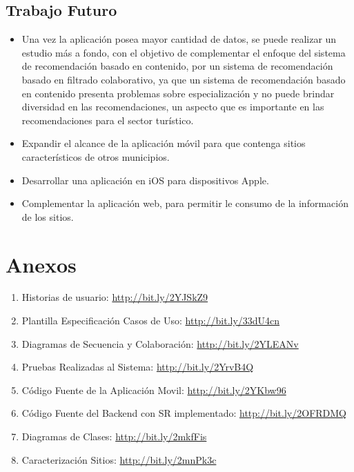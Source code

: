 \documentclass[12pt,letterpaper,openany]{book}
\begin{document}
\section{Trabajo Futuro}
\begin{itemize}
\item Una vez la aplicación posea mayor cantidad de datos, se puede realizar un estudio más a fondo, con el objetivo de complementar el enfoque del sistema de recomendación basado en contenido, por un sistema de recomendación basado en filtrado colaborativo, ya que un sistema de recomendación basado en contenido presenta problemas sobre especialización y no puede brindar diversidad en las recomendaciones, un aspecto que es importante en las recomendaciones para el sector turístico.
\item Expandir el alcance de la aplicación móvil para que contenga sitios característicos de otros municipios.
\item Desarrollar una aplicación en iOS para dispositivos Apple.
\item Complementar la aplicación web, para permitir le consumo de la información de los sitios.
\end{itemize}


\appendix
\chapter{Anexos}\label{aped.A}
\begin{enumerate}
    \item Historias de usuario: \url{http://bit.ly/2YJSkZ9}
    \item Plantilla Especificación Casos de Uso: \url{http://bit.ly/33dU4cn}
    \item Diagramas de Secuencia y Colaboración: \url{http://bit.ly/2YLEANv}
    \item Pruebas Realizadas al Sistema: \url{http://bit.ly/2YrvB4Q}
    \item Código Fuente de la Aplicación Movil: \url{http://bit.ly/2YKbw96}
    \item Código Fuente del Backend con SR implementado: \url{http://bit.ly/2OFRDMQ}	
    \item Diagramas de Clases: \url{http://bit.ly/2mkfFis}	
    \item Caracterización Sitios: \url{http://bit.ly/2mnPk3c}	
\end{enumerate}
\end{document}
